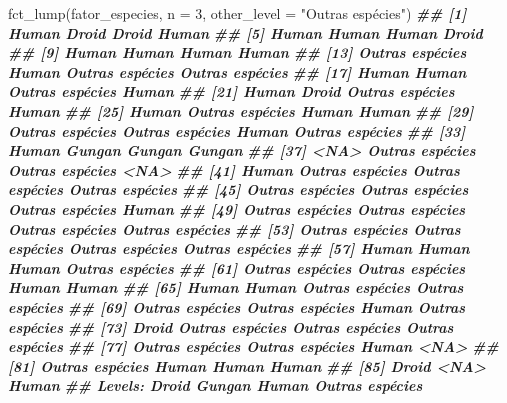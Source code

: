 \documentclass[
]{book}
\newenvironment{Shaded}{\begin{snugshade}}{\end{snugshade}}
\newcommand{\AttributeTok}[1]{\textcolor[rgb]{0.77,0.63,0.00}{#1}}
\newcommand{\DecValTok}[1]{\textcolor[rgb]{0.00,0.00,0.81}{#1}}
\newcommand{\DocumentationTok}[1]{\textcolor[rgb]{0.56,0.35,0.01}{\textbf{\textit{#1}}}}
\newcommand{\FunctionTok}[1]{\textcolor[rgb]{0.00,0.00,0.00}{#1}}
\newcommand{\NormalTok}[1]{#1}
\newcommand{\StringTok}[1]{\textcolor[rgb]{0.31,0.60,0.02}{#1}}
\begin{document}
\begin{Shaded}
\begin{Highlighting}[]
\FunctionTok{fct\_lump}\NormalTok{(fator\_especies, }\AttributeTok{n =} \DecValTok{3}\NormalTok{, }\AttributeTok{other\_level =} \StringTok{"Outras espécies"}\NormalTok{)}
\DocumentationTok{\#\#  [1] Human           Droid           Droid           Human          }
\DocumentationTok{\#\#  [5] Human           Human           Human           Droid          }
\DocumentationTok{\#\#  [9] Human           Human           Human           Human          }
\DocumentationTok{\#\# [13] Outras espécies Human           Outras espécies Outras espécies}
\DocumentationTok{\#\# [17] Human           Human           Outras espécies Human          }
\DocumentationTok{\#\# [21] Human           Droid           Outras espécies Human          }
\DocumentationTok{\#\# [25] Human           Outras espécies Human           Human          }
\DocumentationTok{\#\# [29] Outras espécies Outras espécies Human           Outras espécies}
\DocumentationTok{\#\# [33] Human           Gungan          Gungan          Gungan         }
\DocumentationTok{\#\# [37] \textless{}NA\textgreater{}            Outras espécies Outras espécies \textless{}NA\textgreater{}           }
\DocumentationTok{\#\# [41] Human           Outras espécies Outras espécies Outras espécies}
\DocumentationTok{\#\# [45] Outras espécies Outras espécies Outras espécies Human          }
\DocumentationTok{\#\# [49] Outras espécies Outras espécies Outras espécies Outras espécies}
\DocumentationTok{\#\# [53] Outras espécies Outras espécies Outras espécies Outras espécies}
\DocumentationTok{\#\# [57] Human           Human           Human           Outras espécies}
\DocumentationTok{\#\# [61] Outras espécies Outras espécies Human           Human          }
\DocumentationTok{\#\# [65] Human           Human           Outras espécies Outras espécies}
\DocumentationTok{\#\# [69] Outras espécies Outras espécies Human           Outras espécies}
\DocumentationTok{\#\# [73] Droid           Outras espécies Outras espécies Outras espécies}
\DocumentationTok{\#\# [77] Outras espécies Outras espécies Human           \textless{}NA\textgreater{}           }
\DocumentationTok{\#\# [81] Outras espécies Human           Human           Human          }
\DocumentationTok{\#\# [85] Droid           \textless{}NA\textgreater{}            Human          }
\DocumentationTok{\#\# Levels: Droid Gungan Human Outras espécies}
\end{Highlighting}
\end{Shaded}
\end{document}
